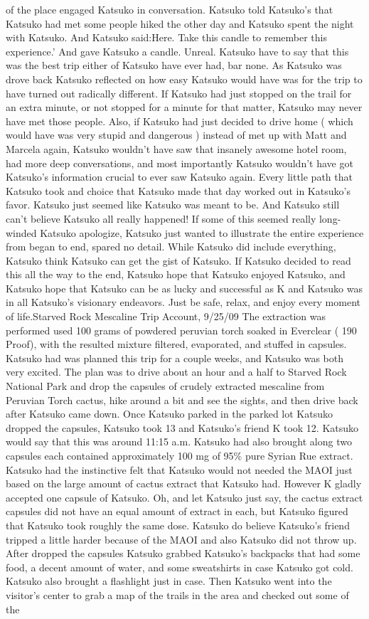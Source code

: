 \documentclass[12pt]{book}
\begin{document}
of the place engaged Katsuko in conversation. Katsuko told Katsuko's that Katsuko had met some people hiked the other day and Katsuko spent the night with Katsuko. And Katsuko said:Here. Take this candle to remember this experience.' And gave Katsuko a candle. Unreal. Katsuko have to say that this was the best trip either of Katsuko have ever had, bar none. As Katsuko was drove back Katsuko reflected on how easy Katsuko would have was for the trip to have turned out radically different. If Katsuko had just stopped on the trail for an extra minute, or not stopped for a minute for that matter, Katsuko may never have met those people. Also, if Katsuko had just decided to drive home ( which would have was very stupid and dangerous ) instead of met up with Matt and Marcela again, Katsuko wouldn't have saw that insanely awesome hotel room, had more deep conversations, and most importantly Katsuko wouldn't have got Katsuko's information crucial to ever saw Katsuko again. Every little path that Katsuko took and choice that Katsuko made that day worked out in Katsuko's favor. Katsuko just seemed like Katsuko was meant to be. And Katsuko still can't believe Katsuko all really happened! If some of this seemed really long-winded Katsuko apologize, Katsuko just wanted to illustrate the entire experience from began to end, spared no detail. While Katsuko did include everything, Katsuko think Katsuko can get the gist of Katsuko. If Katsuko decided to read this all the way to the end, Katsuko hope that Katsuko enjoyed Katsuko, and Katsuko hope that Katsuko can be as lucky and successful as K and Katsuko was in all Katsuko's visionary endeavors. Just be safe, relax, and enjoy every moment of life.Starved Rock Mescaline Trip Account, 9/25/09 The extraction was performed used 100 grams of powdered peruvian torch soaked in Everclear ( 190 Proof), with the resulted mixture filtered, evaporated, and stuffed in capsules. Katsuko had was planned this trip for a couple weeks, and Katsuko was both very excited. The plan was to drive about an hour and a half to Starved Rock National Park and drop the capsules of crudely extracted mescaline from Peruvian Torch cactus, hike around a bit and see the sights, and then drive back after Katsuko came down. Once Katsuko parked in the parked lot Katsuko dropped the capsules, Katsuko took 13 and Katsuko's friend K took 12. Katsuko would say that this was around 11:15 a.m. Katsuko had also brought along two capsules each contained approximately 100 mg of 95\% pure Syrian Rue extract. Katsuko had the instinctive felt that Katsuko would not needed the MAOI just based on the large amount of cactus extract that Katsuko had. However K gladly accepted one capsule of Katsuko. Oh, and let Katsuko just say, the cactus extract capsules did not have an equal amount of extract in each, but Katsuko figured that Katsuko took roughly the same dose. Katsuko do believe Katsuko's friend tripped a little harder because of the MAOI and also Katsuko did not throw up. After dropped the capsules Katsuko grabbed Katsuko's backpacks that had some food, a decent amount of water, and some sweatshirts in case Katsuko got cold. Katsuko also brought a flashlight just in case. Then Katsuko went into the visitor's center to grab a map of the trails in the area and checked out some of the 
\end{document}
